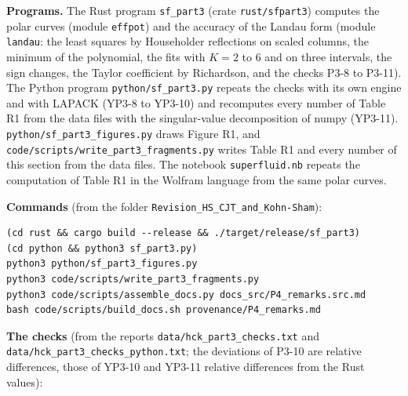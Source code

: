 \documentclass[
  10pt,
]{article}
\begin{document}
\textbf{Programs.} The Rust program \texttt{sf\_part3} (crate
\texttt{rust/sfpart3}) computes the polar curves (module
\texttt{effpot}) and the accuracy of the Landau form (module
\texttt{landau}: the least squares by Householder reflections on scaled
columns, the minimum of the polynomial, the fits with \(K=2\) to \(6\)
and on three intervals, the sign changes, the Taylor coefficient by
Richardson, and the checks P3-8 to P3-11). The Python program
\texttt{python/sf\_part3.py} repeats the checks with its own engine and
with LAPACK (YP3-8 to YP3-10) and recomputes every number of Table R1
from the data files with the singular-value decomposition of numpy
(YP3-11). \texttt{python/sf\_part3\_figures.py} draws Figure R1, and
\texttt{code/scripts/write\_part3\_fragments.py} writes Table R1 and
every number of this section from the data files. The notebook
\texttt{superfluid.nb} repeats the computation of Table R1 in the
Wolfram language from the same polar curves.

\textbf{Commands} (from the folder
\texttt{Revision\_HS\_CJT\_and\_Kohn-Sham}):

\begin{verbatim}
(cd rust && cargo build --release && ./target/release/sf_part3)
(cd python && python3 sf_part3.py)
python3 python/sf_part3_figures.py
python3 code/scripts/write_part3_fragments.py
python3 code/scripts/assemble_docs.py docs_src/P4_remarks.src.md
bash code/scripts/build_docs.sh provenance/P4_remarks.md
\end{verbatim}

\textbf{The checks} (from the reports
\texttt{data/hck\_part3\_checks.txt} and
\texttt{data/hck\_part3\_checks\_python.txt}; the deviations of P3-10
are relative differences, those of YP3-10 and YP3-11 relative
differences from the Rust values):
\end{document}
